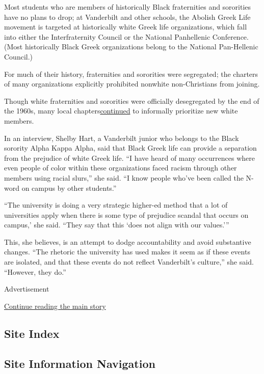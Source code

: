 Most students who are members of historically Black fraternities and
sororities have no plans to drop; at Vanderbilt and other schools, the
Abolish Greek Life movement is targeted at historically white Greek life
organizations, which fall into either the Interfraternity Council or the
National Panhellenic Conference. (Most historically Black Greek
organizations belong to the National Pan-Hellenic Council.)

For much of their history, fraternities and sororities were segregated;
the charters of many organizations explicitly prohibited nonwhite
non-Christians from joining.

Though white fraternities and sororities were officially desegregated by
the end of the 1960s, many local
chapters\href{https://academic.oup.com/socpro/article-abstract/57/4/653/1667281?redirectedFrom=fulltext}{continued}
to informally prioritize new white members.

In an interview, Shelby Hart, a Vanderbilt junior who belongs to the
Black sorority Alpha Kappa Alpha, said that Black Greek life can provide
a separation from the prejudice of white Greek life. ``I have heard of
many occurrences where even people of color within these organizations
faced racism through other members using racial slurs,'' she said. ``I
know people who've been called the N-word on campus by other students.''

``The university is doing a very strategic higher-ed method that a lot
of universities apply when there is some type of prejudice scandal that
occurs on campus,' she said. ``They say that this `does not align with
our values.'''

This, she believes, is an attempt to dodge accountability and avoid
substantive changes. ``The rhetoric the university has used makes it
seem as if these events are isolated, and that these events do not
reflect Vanderbilt's culture,'' she said. ``However, they do.''

Advertisement

\protect\hyperlink{after-bottom}{Continue reading the main story}

\hypertarget{site-index}{%
\subsection{Site Index}\label{site-index}}

\hypertarget{site-information-navigation}{%
\subsection{Site Information
Navigation}\label{site-information-navigation}}

